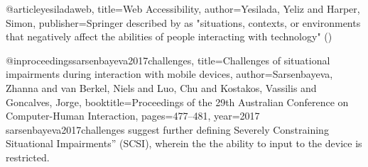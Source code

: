 %
%
@article{yesiladaweb,
  title={Web Accessibility},
  author={Yesilada, Yeliz and Harper, Simon},
  publisher={Springer}
}
described by \citeauthor{yesiladaweb} as "situations, contexts, or environments that negatively affect the abilities of people interacting with technology" (\citeyear{yesiladaweb})

@inproceedings{sarsenbayeva2017challenges,
  title={Challenges of situational impairments during interaction with mobile devices},
  author={Sarsenbayeva, Zhanna and van Berkel, Niels and Luo, Chu and Kostakos, Vassilis and Goncalves, Jorge},
  booktitle={Proceedings of the 29th Australian Conference on Computer-Human Interaction},
  pages={477--481},
  year={2017}
}
sarsenbayeva2017challenges suggest further defining Severely Constraining Situational Impairments” (SCSI), wherein the the ability to input to the device is restricted.

% 

